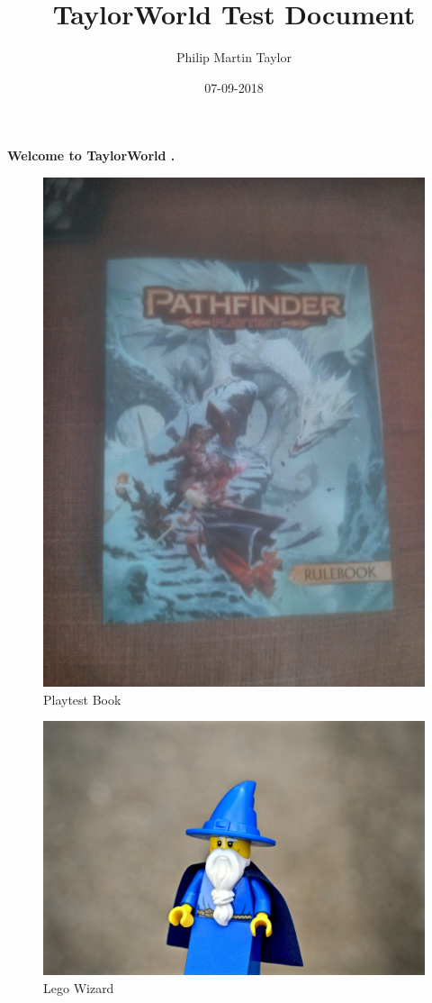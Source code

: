\documentclass[12pt,a4paper]{book}
\date{07-09-2018}
\author{Philip Martin Taylor}
\title{TaylorWorld Test Document}
\begin{document}
\begin{center}
\textbf{Welcome to TaylorWorld \texttrademark.}
\end{center}
\begin{figure}[h]
  \centering
  \includegraphics[scale=0.03]{img.jpg}
  \caption{Playtest Book}
\end{figure}
\begin{figure}
  \centering
  \includegraphics[scale=0.1]{wizard.jpg}
  \caption{Lego Wizard}
\end{figure}
\end{document}
